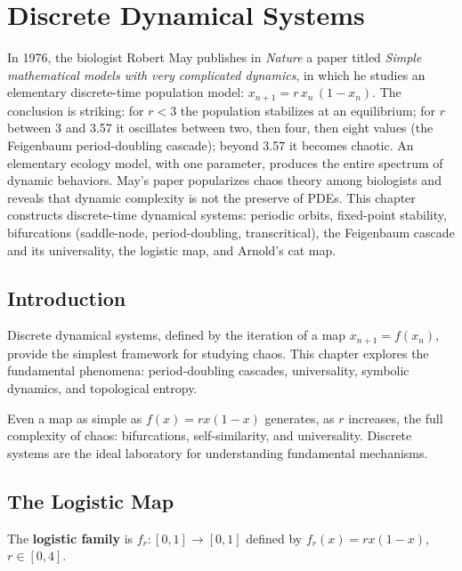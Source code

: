 \chapter{Discrete Dynamical Systems}
\label{ch:discrete}

In 1976, the biologist Robert May publishes in \emph{Nature} a paper titled \emph{Simple mathematical models with very complicated dynamics}, in which he studies an elementary discrete-time population model: $x_{n+1} = r\,x_n\,(1 - x_n)$. The conclusion is striking: for $r < 3$ the population stabilizes at an equilibrium; for $r$ between 3 and 3.57 it oscillates between two, then four, then eight values (the Feigenbaum period-doubling cascade); beyond 3.57 it becomes chaotic. An elementary ecology model, with one parameter, produces the entire spectrum of dynamic behaviors. May's paper popularizes chaos theory among biologists and reveals that dynamic complexity is not the preserve of PDEs. This chapter constructs discrete-time dynamical systems: periodic orbits, fixed-point stability, bifurcations (saddle-node, period-doubling, transcritical), the Feigenbaum cascade and its universality, the logistic map, and Arnold's cat map.

\section{Introduction}

Discrete dynamical systems, defined by the
iteration of a map $x_{n+1} = f(x_n)$, provide the simplest framework for
studying chaos. This chapter explores the fundamental phenomena:
period-doubling cascades, universality, symbolic dynamics, and topological
entropy.

\begin{intuition}
Even a map as simple as $f(x) = rx(1-x)$ generates, as $r$ increases, the
full complexity of chaos: bifurcations, self-similarity, and universality.
Discrete systems are the ideal laboratory for understanding fundamental
mechanisms.
\end{intuition}

\section{The Logistic Map}

\begin{definition}
The \textbf{logistic family} is $f_r : [0,1] \to [0,1]$ defined by
$f_r(x) = rx(1-x)$, $r \in [0, 4]$.
\end{definition}

